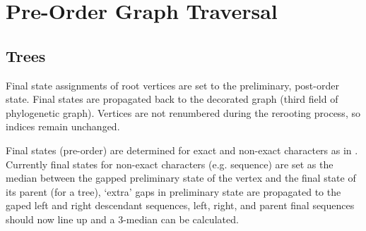 \documentclass[11pt]{article}
\begin{document}
	\section{Pre-Order Graph Traversal}
		\subsection{Trees}
		Final state assignments of root vertices are set to the preliminary, post-order state.
		Final  states are propagated back to the decorated graph (third field of phylogenetic graph).
		Vertices are not renumbered during the rerooting process, so indices remain unchanged.
		
		Final states (pre-order) are determined for exact and non-exact characters as in \cite{Wheeler2012}.  Currently final states for 
		non-exact characters (e.g. sequence) are set as the median between the gapped preliminary state of the vertex and the final state of its parent
		(for a tree), `extra' gaps in preliminary state are propagated to the gaped left and right descendant sequences, left, right, and parent final sequences
		should now line up and a 3-median can be calculated.
		
\end{document}

